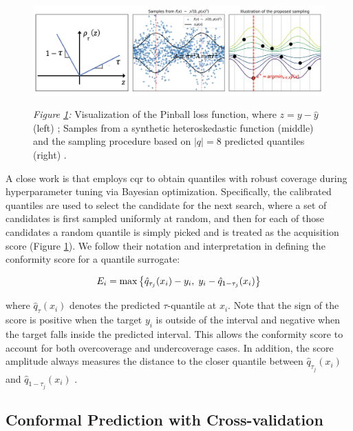{\begin{description}[leftmargin=0cm, listparindent=\parindent]
	 \begin{figure}[t]	
	 	\centering
		\includegraphics[scale=0.48]{figs/pinball_loss_and_CQR.png}
		\label{fig:CQR}
		\parbox{\linewidth}{
	 	\vspace{0.5em}
 	 	{\small \textit{Figure \ref{fig:CQR}:} Visualization of the Pinball loss function, where $z=y - \hat{y}$ (left) \cite{romano2019conformalized}; Samples from a synthetic heteroskedastic function (middle) and  the sampling procedure based on $|q| = 8$ predicted quantiles (right) \cite{salinas2023optimizing}.
 	 	}
 		}
	\end{figure}
	 
	 A close work is \cite{salinas2023optimizing} that employs \gls{cqr} to obtain quantiles with robust coverage during hyperparameter tuning via Bayesian optimization. Specifically, the calibrated quantiles are used to select the candidate for the next search, where a set of candidates is first sampled uniformly at random, and then for each of those candidates a random quantile is simply picked and is treated as the acquisition score (Figure \ref{fig:CQR}). We follow their notation and interpretation in defining the conformity score for a quantile surrogate:  
	 
	 \begin{equation}
		E_i = \max \big\{\hat{q}_{\tau_j}(x_i) - y_i, \; y_i - \hat{q}_{1-\tau_j}(x_i) \big\}
	 \vspace{0.7em}
	 \label{scoreCQR}
	 \end{equation}
	 
	 \noindent where $\hat{q}_{\tau}(x_i)$ denotes the predicted $\tau$-quantile at $x_i$. Note that the sign of the score is positive when the target $y_i$ is outside of the interval and negative when the target falls inside the predicted interval. This allows the conformity score to account for both overcoverage and undercoverage cases. In addition, the score amplitude always measures the distance to the closer quantile between $\hat{q}_{\tau_j}(x_i)$ and $\hat{q}_{1-\tau_j}(x_i)$ \cite{romano2019conformalized, salinas2023optimizing}.	 

\end{description}


\subsection{Conformal Prediction with Cross-validation}}

